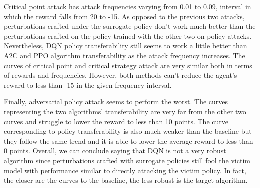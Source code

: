 Critical point attack has attack frequencies varying from 0.01 to 0.09, interval in which the reward falls from 20 to -15. As opposed to the previous two attacks, perturbations crafted under the surrogate policy don't work much better than the perturbations crafted on the policy trained with the other two on-policy attacks. Nevertheless, DQN policy transferability still seems to work a little better than A2C and PPO algorithm transferability as the attack frequency increases.
The curves of critical point and critical strategy attack are very similar both in terms of rewards and frequencies. However, both methods can't reduce the agent's reward to less than -15 in the given frequency interval. 

Finally, adversarial policy attack seems to perform the worst. The curves representing the two algorithms' transferability are very far from the other two curves and struggle to lower the reward to less than 10 points. The curve corresponding to policy transferability is also much weaker than the baseline but they follow the same trend and it is able to lower the average reward to less than 0 points. Overall, we can conclude saying that DQN is not a very robust algorithm since perturbations crafted with surrogate policies still fool the victim model with performance similar to directly attacking the victim policy. In fact, the closer are the curves to the baseline, the less robust is the target algorithm.

